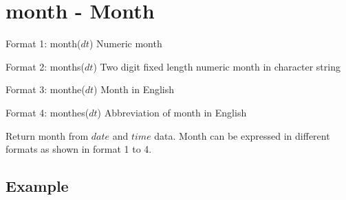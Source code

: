 
%

\section{month - Month\label{sect:month}}

Format 1: month($dt$) Numeric month 

Format 2: months($dt$) Two digit fixed length numeric month in character string

Format 3: monthe($dt$) Month in English

Format 4: monthes($dt$) Abbreviation of month in English

Return month from $date$ and $time$ data. Month can be expressed in different formats as shown in format 1 to 4. 


\subsection*{Example}


%

